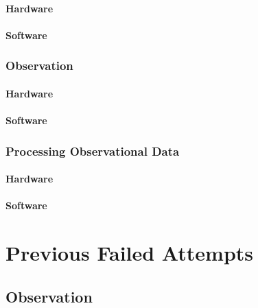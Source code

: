 				\subsubsection{Hardware}
				\subsubsection{Software}
			\subsection{Observation}
				\subsubsection{Hardware}
				\subsubsection{Software}
			\subsection{Processing Observational Data}
				\subsubsection{Hardware}
				\subsubsection{Software}
				
	\chapter{Previous Failed Attempts}
		\section{Observation}
	